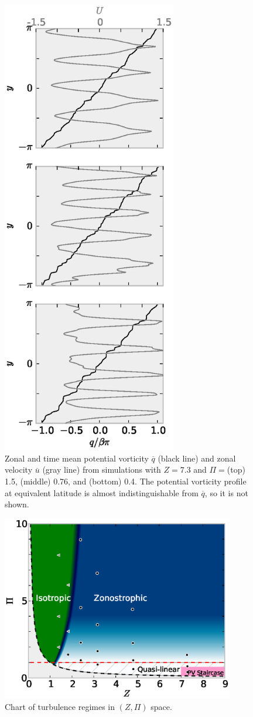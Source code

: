 \documentclass{ametsoc}
\begin{document}
\begin{figure}
\begin{center}
\includegraphics[width=3in]{PV_vs_y}
\caption{Zonal and time mean potential vorticity $\overline{q}$ (black line)
and zonal velocity $\overline{u}$ (gray line) from simulations with
$Z=7.3$ and $\Pi=$(top) 1.5, (middle) 0.76, and (bottom) 0.4. The
potential vorticity profile at equivalent latitude is almost indistinguishable
from $\overline{q}$, so it is not shown.}
\label{PV_vs_y_drag1e-4}
\end{center}
\end{figure}

\begin{figure}
\begin{center}
\includegraphics[width=4in]{regime_illustration}\caption{Chart of turbulence regimes in $(Z,\Pi)$ space.}
\label{regime_illustration}
\end{center}
\end{figure}
\end{document}
